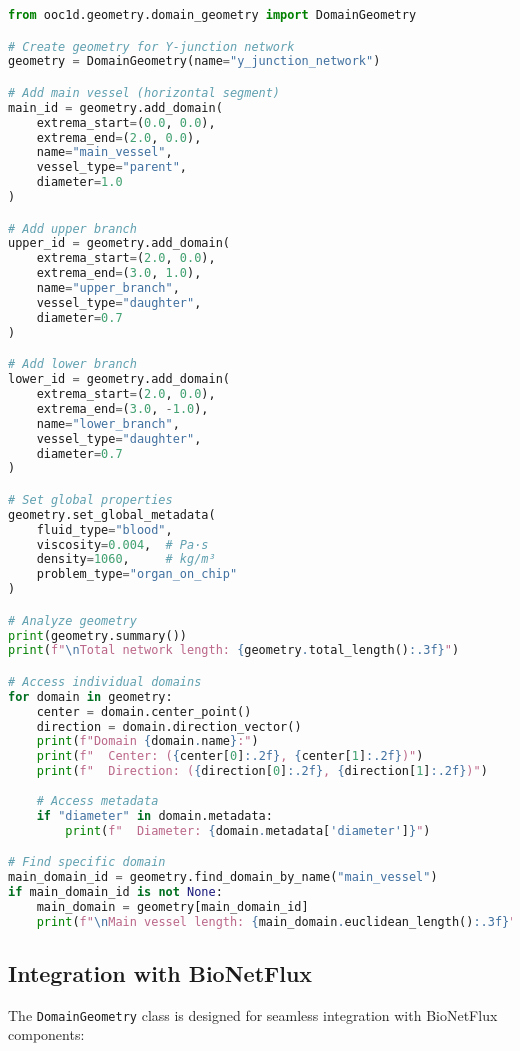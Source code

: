 \begin{lstlisting}[language=Python, caption=Complete Geometry Usage Example]
from ooc1d.geometry.domain_geometry import DomainGeometry

# Create geometry for Y-junction network
geometry = DomainGeometry(name="y_junction_network")

# Add main vessel (horizontal segment)
main_id = geometry.add_domain(
    extrema_start=(0.0, 0.0),
    extrema_end=(2.0, 0.0),
    name="main_vessel",
    vessel_type="parent",
    diameter=1.0
)

# Add upper branch
upper_id = geometry.add_domain(
    extrema_start=(2.0, 0.0),
    extrema_end=(3.0, 1.0),
    name="upper_branch",
    vessel_type="daughter",
    diameter=0.7
)

# Add lower branch  
lower_id = geometry.add_domain(
    extrema_start=(2.0, 0.0),
    extrema_end=(3.0, -1.0),
    name="lower_branch",
    vessel_type="daughter",
    diameter=0.7
)

# Set global properties
geometry.set_global_metadata(
    fluid_type="blood",
    viscosity=0.004,  # Pa·s
    density=1060,     # kg/m³
    problem_type="organ_on_chip"
)

# Analyze geometry
print(geometry.summary())
print(f"\nTotal network length: {geometry.total_length():.3f}")

# Access individual domains
for domain in geometry:
    center = domain.center_point()
    direction = domain.direction_vector()
    print(f"Domain {domain.name}:")
    print(f"  Center: ({center[0]:.2f}, {center[1]:.2f})")
    print(f"  Direction: ({direction[0]:.2f}, {direction[1]:.2f})")
    
    # Access metadata
    if "diameter" in domain.metadata:
        print(f"  Diameter: {domain.metadata['diameter']}")

# Find specific domain
main_domain_id = geometry.find_domain_by_name("main_vessel")
if main_domain_id is not None:
    main_domain = geometry[main_domain_id]
    print(f"\nMain vessel length: {main_domain.euclidean_length():.3f}")
\end{lstlisting}

\subsection{Integration with BioNetFlux}
\label{subsec:bionetflux_integration}

The \texttt{DomainGeometry} class is designed for seamless integration with BioNetFlux components:

